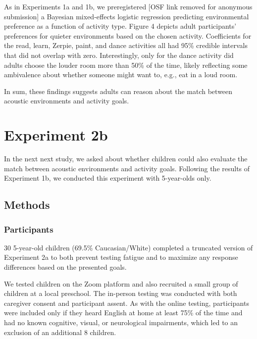 \documentclass[10pt, letterpaper]{article}
\begin{document}
As in Experiments 1a and 1b, we preregistered {[}OSF link removed for
anonymous submission{]} a Bayesian mixed-effects logistic regression
predicting environmental preference as a function of activity type.
Figure 4 depicts adult participants' preferences for quieter
environments based on the chosen activity. Coefficients for the read,
learn, Zerpie, paint, and dance activities all had 95\% credible
intervals that did not overlap with zero. Interestingly, only for the
dance activity did adults choose the louder room more than 50\% of the
time, likely reflecting some ambivalence about whether someone might
want to, e.g., eat in a loud room.

In sum, these findings suggests adults can reason about the match
between acoustic environments and activity goals.

\hypertarget{experiment-2b}{%
\section{Experiment 2b}\label{experiment-2b}}

In the next next study, we asked about whether children could also
evaluate the match between acoustic environments and activity goals.
Following the results of Experiment 1b, we conducted this experiment
with 5-year-olds only.

\hypertarget{methods-3}{%
\subsection{Methods}\label{methods-3}}

\hypertarget{participants-3}{%
\subsubsection{Participants}\label{participants-3}}

30 5-year-old children (69.5\% Caucasian/White) completed a truncated
version of Experiment 2a to both prevent testing fatigue and to maximize
any response differences based on the presented goals.

We tested children on the Zoom platform and also recruited a small group
of children at a local preschool. The in-person testing was conducted
with both caregiver consent and participant assent. As with the online
testing, participants were included only if they heard English at home
at least 75\% of the time and had no known cognitive, visual, or
neurological impairments, which led to an exclusion of an additional 8
children.
\end{document}
